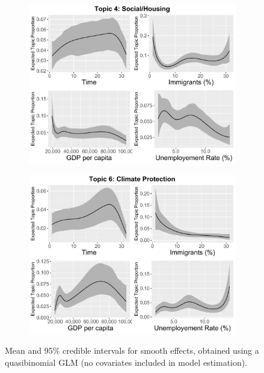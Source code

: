 \begin{figure}[h!]
  \centering
  \captionsetup{justification=centering,margin=2cm}
  \begin{subfigure}[b]{0.4\linewidth}
    \includegraphics[width=\linewidth]{../plots/6_1/quasi_t4_cont_ctm.pdf}
  \end{subfigure}
  \begin{subfigure}[b]{0.4\linewidth}
    \includegraphics[width=\linewidth]{../plots/6_1/quasi_t6_cont_ctm.pdf}
  \end{subfigure}
  \caption{Mean and 95\% credible intervals for smooth effects, obtained
using a quasibinomial GLM (no covariates included in model estimation).}
  \label{fig:quasi_t46_cont_ctm}
\end{figure}

